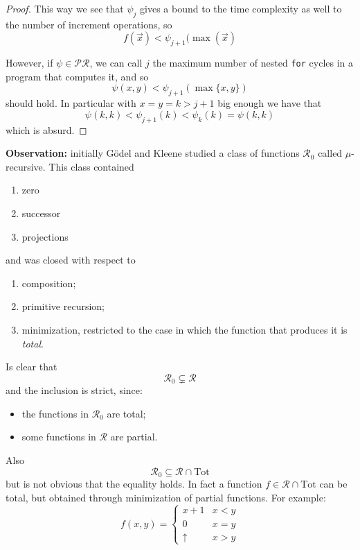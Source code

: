 \begin{theorem}
\begin{proof}
    This way we see that $\psi_j$ gives a bound to the time complexity
    as well to the number of increment operations, so
    \[f(\vec{x}) < \psi_{j+1}(\max(\vec{x})\]

    However, if $\psi \in \mathcal{PR}$, we can call $j$ the
    maximum number of nested \texttt{for} cycles in a program that
    computes it, and so \[\psi(x,y) < \psi_{j+1}(\max\{x,y\})\] should
    hold. In particular with $x=y=k>j+1$ big enough we have
    that \[\psi(k,k) < \psi_{j+1}(k) < \psi_k(k) = \psi(k,k)\] which is
    absurd.
  \end{proof}
\end{theorem}

\newpage

\textbf{Observation:} initially Gödel and Kleene studied a class
of functions $\mathcal{R}_0$ called $\mu$-recursive. This class
contained
\begin{enumerate}[label=\alph*]
\item zero
\item successor
\item projections
\end{enumerate}

and was closed with respect to

\begin{enumerate}
\item composition;
\item primitive recursion;
\item minimization, restricted to the case in which the function that
  produces it is \emph{total}.
\end{enumerate}

Is clear that \[\mathcal{R}_0 \subsetneq \mathcal{R}\] and the
inclusion is strict, since:
\begin{itemize}
\item the functions in $\mathcal{R}_0$ are total;
\item some functions in $\mathcal{R}$ are partial.
\end{itemize}

Also \[\mathcal{R}_0 \subseteq \mathcal{R} \cap \text{Tot}\] but is
not obvious that the equality holds. In fact a function
$f \in \mathcal{R} \cap \text{Tot}$ can be total, but obtained through
minimization of partial functions. For example:
\[
  f(x,y) = \begin{cases}
    x+1 & x<y \\
    0 & x=y \\
    \uparrow & x>y
  \end{cases}
\]


